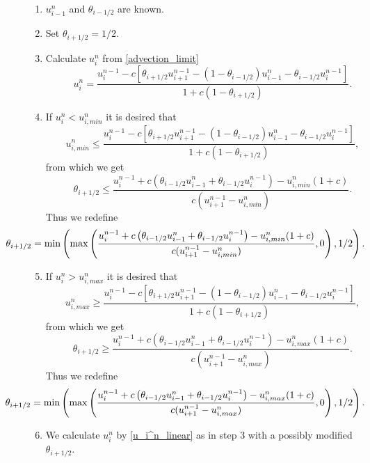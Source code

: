 \documentclass[../include.tex]{subfiles}
\begin{document}
\begin{enumerate}
	\item $ u_{i-1}^n $ and $\theta_{i-1/2}$ are known.
	\item Set $ \theta_{i+1/2}=1/2 $.
	\item Calculate $ u_i^n $ from \eqref{advection_limit}
	\begin{equation}
		\label{u_i^n_linear}
		u_i^n = \frac{u_i^{n - 1} - 
		c
		\left[\theta_{i+1/2}u^{n-1}_{i+1} -
		(1 - \theta_{i-1/2})u^n_{i-1} - \theta_{i-1/2}u^{n-1}_{i}
		\right]}{1+ c(1 - \theta_{i+1/2})}.
	\end{equation}
	\item If $ u_i^n < u_{i,min}^n $ it is desired that
	\[u_{i,min}^n \leq \frac{u_i^{n - 1} - 
		c
		\left[\theta_{i+1/2}u^{n-1}_{i+1} -
		(1 - \theta_{i-1/2})u^n_{i-1} - \theta_{i-1/2}u^{n-1}_{i}
		\right]}{1+ c(1 - \theta_{i+1/2})},
	\]
from which we get
\[
\theta_{i+1/2} \leq \frac{u_i^{n-1} + c\left(\theta_{i-1/2}u^n_{i-1} + \theta_{i-1/2}u^{n-1}_{i}\right) - u_{i,min}^n(1+c)}{c(u_{i+1}^{n-1} - u_{i,min}^n)}.
\]
Thus we redefine
\begin{equation}
	\hspace{-20mm}\theta_{i+1/2} = \min \left(\max\left(\frac{u_i^{n-1} + c\left(\theta_{i-1/2}u^n_{i-1} + \theta_{i-1/2}u^{n-1}_{i}\right) - u_{i,min}^n(1+c)}{c(u_{i+1}^{n-1} - u_{i,min}^n)},0\right),1/2\right).
\end{equation}
\item If $ u_i^n > u_{i,max}^n $ it is desired that
\[u_{i,max}^n \geq \frac{u_i^{n - 1} - 
	c
	\left[\theta_{i+1/2}u^{n-1}_{i+1} -
	(1 - \theta_{i-1/2})u^n_{i-1} - \theta_{i-1/2}u^{n-1}_{i}
	\right]}{1+ c(1 - \theta_{i+1/2})},
\]
from which we get
\[
\theta_{i+1/2} \geq \frac{u_i^{n-1} + c\left(\theta_{i-1/2}u^n_{i-1} + \theta_{i-1/2}u^{n-1}_{i}\right) - u_{i,max}^n(1+c)}{c(u_{i+1}^{n-1} - u_{i,max}^n)}.
\]
Thus we redefine
\begin{equation}
	\hspace{-20mm}\theta_{i+1/2} = \min \left(\max\left(\frac{u_i^{n-1} + c\left(\theta_{i-1/2}u^n_{i-1} + \theta_{i-1/2}u^{n-1}_{i}\right) - u_{i,max}^n(1+c)}{c(u_{i+1}^{n-1} - u_{i,max}^n)},0\right),1/2\right).
\end{equation}
\item We calculate $ u_i^n $ by \eqref{u_i^n_linear} as in step 3 with a possibly modified $ \theta_{i+1/2} $.
\end{enumerate}
\end{document}
